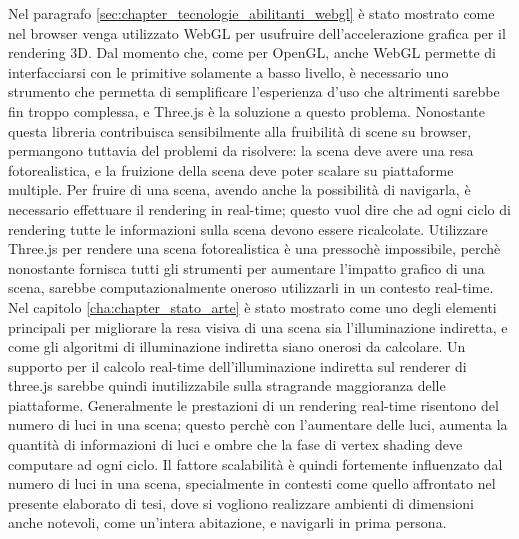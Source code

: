 Nel paragrafo \ref{sec:chapter_tecnologie_abilitanti_webgl} è stato mostrato come nel browser venga utilizzato WebGL per usufruire dell’accelerazione grafica per il rendering 3D. 
Dal momento che, come per OpenGL, anche WebGL permette di interfacciarsi con le primitive solamente a basso livello, è necessario uno strumento che permetta di semplificare l’esperienza d’uso che altrimenti sarebbe fin troppo complessa, e Three.js è la soluzione a questo problema. Nonostante questa libreria contribuisca sensibilmente alla fruibilità di scene su browser, permangono tuttavia del problemi da risolvere: la scena deve avere una resa fotorealistica, e la fruizione della scena deve poter scalare su piattaforme multiple.
Per fruire di una scena, avendo anche la possibilità di navigarla, è necessario effettuare il rendering in real-time; questo vuol dire che ad ogni ciclo di rendering tutte le informazioni sulla scena devono essere ricalcolate.
Utilizzare Three.js per rendere una scena fotorealistica è una pressochè impossibile, perchè nonostante fornisca tutti gli strumenti per aumentare l’impatto grafico di una scena, sarebbe computazionalmente oneroso utilizzarli in un contesto real-time.
Nel capitolo \ref{cha:chapter_stato_arte} è stato mostrato come uno degli elementi principali per migliorare la resa visiva di una scena sia l’illuminazione indiretta, e come gli algoritmi di illuminazione indiretta siano onerosi da calcolare. 
Un supporto per il calcolo real-time dell’illuminazione indiretta sul renderer di three.js sarebbe quindi inutilizzabile sulla stragrande maggioranza delle piattaforme. Generalmente le prestazioni di un rendering real-time risentono del numero di luci in una scena; questo perchè con l’aumentare delle luci, aumenta la quantità di informazioni di luci e ombre che la fase di vertex shading deve computare ad ogni ciclo. 
Il fattore scalabilità è quindi fortemente influenzato dal numero di luci in una scena, specialmente in contesti come quello affrontato nel presente elaborato di tesi, dove si vogliono realizzare ambienti di dimensioni anche notevoli, come un’intera abitazione, e navigarli in prima persona. 

